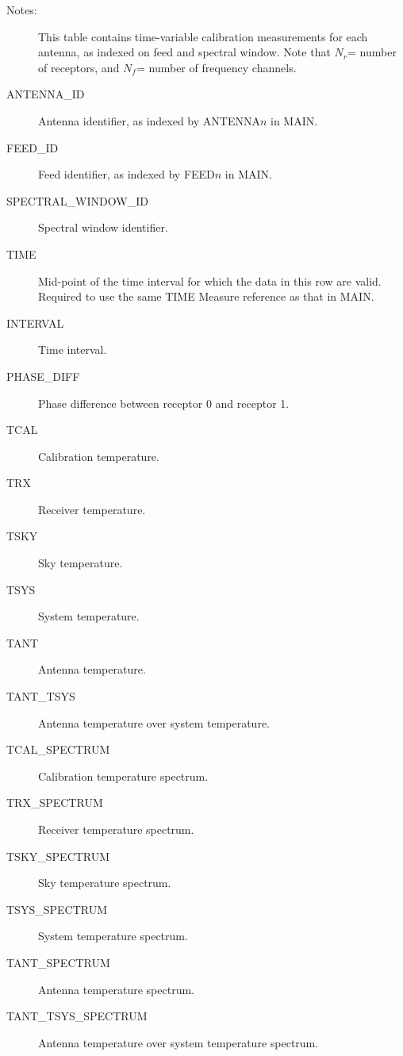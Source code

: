 \documentclass{article}
\newcommand{\nr}{$N_r$}
\newcommand{\nf}{$N_f$}
\begin{document}
\begin{itemize}
\begin{description}
\item[Notes:] This table contains time-variable calibration
measurements for each antenna, as indexed on feed and spectral window.
Note that \nr = number of receptors, and \nf = number of
frequency channels.

\item[ANTENNA\_ID] Antenna identifier, as indexed by ANTENNA$n$ in MAIN.

\item[FEED\_ID] Feed identifier, as indexed by FEED$n$ in MAIN.

\item[SPECTRAL\_WINDOW\_ID] Spectral window identifier.

\item[TIME] Mid-point of the time interval for which the data in this
row are valid. Required to use the same TIME Measure reference as that
in MAIN.

\item[INTERVAL] Time interval.

\item[PHASE\_DIFF] Phase difference between receptor 0 and receptor 1.

\item[TCAL] Calibration temperature.

\item[TRX] Receiver temperature.

\item[TSKY] Sky temperature.

\item[TSYS] System temperature.

\item[TANT] Antenna temperature.

\item[TANT\_TSYS] Antenna temperature over system temperature.

\item[TCAL\_SPECTRUM] Calibration temperature spectrum.

\item[TRX\_SPECTRUM] Receiver temperature spectrum.

\item[TSKY\_SPECTRUM] Sky temperature spectrum.

\item[TSYS\_SPECTRUM] System temperature spectrum.

\item[TANT\_SPECTRUM] Antenna temperature spectrum.

\item[TANT\_TSYS\_SPECTRUM] Antenna temperature over system
temperature spectrum.


\end{description}
\end{itemize}
\end{document}
